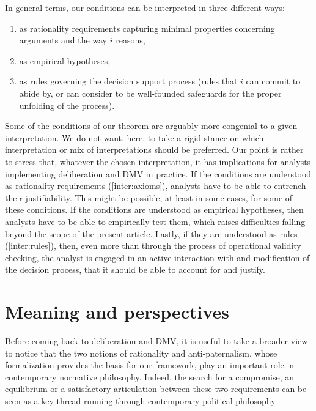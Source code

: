 \documentclass[version=3.21, pagesize, twoside=off, bibliography=totoc, DIV=calc, fontsize=12pt, a4paper, french, english]{scrartcl}
\begin{document}
In general terms, our conditions can be interpreted in three different ways:
\begin{enumerate}[label=\emph{\roman*}, ref=\emph{\roman*}]
	\item \label{inter:axioms} as rationality requirements capturing minimal properties concerning arguments and the way $i$ reasons,
	\item \label{inter:empir} as empirical hypotheses,
	\item \label{inter:rules} as rules governing the decision support process (rules that $i$ can commit to abide by, or can consider to be well-founded safeguards for the proper unfolding of the process).
\end{enumerate}

Some of the conditions of our theorem are arguably more congenial to a given interpretation. 
We do not want, here, to take a rigid stance on which interpretation or mix of interpretations should be preferred. 
Our point is rather to stress that, whatever the chosen interpretation, it has implications for analysts implementing deliberation and DMV in practice. 
If the conditions are understood as rationality requirements (\ref{inter:axioms}), analysts have to be able to entrench their justifiability. 
This might be possible, at least in some cases, for some of these conditions. 
If the conditions are understood as empirical hypotheses, then analysts have to be able to empirically test them, which raises difficulties falling beyond the scope of the present article.
Lastly, if they are understood as rules (\ref{inter:rules}), then, even more than through the process of operational validity checking, the analyst is engaged in an active interaction with and modification of the decision process, that it should be able to account for and justify.

\section{Meaning and perspectives}
\label{disc}
Before coming back to deliberation and DMV, it is useful to take a broader view to notice that the two notions of rationality and anti-paternalism, whose formalization provides the basis for our framework, play an important role in contemporary normative philosophy. 
Indeed, the search for a compromise, an equilibrium or a satisfactory articulation between these two requirements can be seen as a key thread running through contemporary political philosophy.
\end{document}
